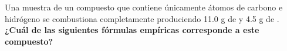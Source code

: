 Una muestra de un compuesto que contiene únicamente átomos de carbono e hidrógeno se combustiona completamente produciendo 11.0 g de  y 4.5 g de .
\textbf{¿Cuál de las siguientes fórmulas empíricas corresponde a este compuesto?}

\begin{choices}
    \choice  {}
    \choice  {}
    \choice  {}
    \choice  {}
\end{choices}